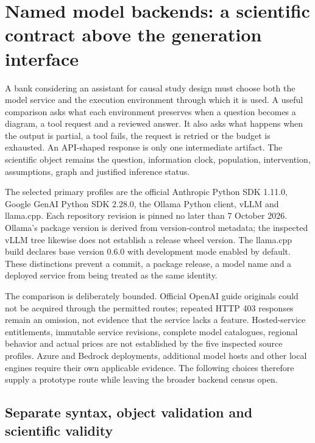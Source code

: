 \section{Named model backends: a scientific contract above the generation interface}
\label{sec:exec24-backend-census}

A bank considering an assistant for causal study design must choose both the
model service and the execution environment through which it is used. A useful
comparison asks what each environment preserves when a question becomes a
diagram, a tool request and a reviewed answer. It also asks what happens when
the output is partial, a tool fails, the request is retried or the budget is
exhausted. An API-shaped response is only one intermediate artifact. The
scientific object remains the question, information clock, population,
intervention, assumptions, graph and justified inference status.
\citep{exec24_backend_reference}

The selected primary profiles are the official Anthropic Python SDK 1.11.0,
Google GenAI Python SDK 2.28.0, the Ollama Python client, vLLM and llama.cpp.
Each repository revision is pinned no later than 7 October 2026. Ollama's
package version is derived from version-control metadata; the inspected
vLLM tree likewise does not establish a release wheel version. The llama.cpp
build declares base version 0.6.0 with development mode enabled by default.
These distinctions prevent a commit, a package release, a model name and a
deployed service from being treated as the same identity.
\citep{exec24_backend_anthropic,exec24_backend_google,exec24_backend_ollama,
exec24_backend_vllm,exec24_backend_llamacpp}

The comparison is deliberately bounded. Official OpenAI guide originals
could not be acquired through the permitted routes; repeated HTTP 403
responses remain an omission, not evidence that the service lacks a feature.
Hosted-service entitlements, immutable service revisions, complete model
catalogues, regional behavior and actual prices are not established by the
five inspected source profiles. Azure and Bedrock deployments, additional
model hosts and other local engines require their own applicable evidence.
The following choices therefore supply a prototype route while leaving the
broader backend census open.\citep{exec24_backend_reference}

\subsection{Separate syntax, object validation and scientific validity}


